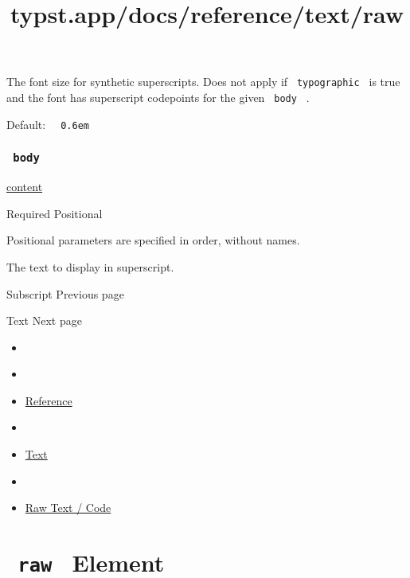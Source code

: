 The font size for synthetic superscripts. Does not apply if
\texttt{\ typographic\ } is true and the font has superscript codepoints
for the given \texttt{\ body\ } .

Default: \texttt{\ }{\texttt{\ 0.6em\ }}\texttt{\ }

\subsubsection{\texorpdfstring{\texttt{\ body\ }}{ body }}\label{parameters-body}

\href{/docs/reference/foundations/content/}{content}

{Required} {{ Positional }}

\label{parameters-body-positional-tooltip}
Positional parameters are specified in order, without names.

The text to display in superscript.

\href{/docs/reference/text/sub/}{\pandocbounded{}}

{ Subscript } { Previous page }

\href{/docs/reference/text/text/}{\pandocbounded{}}

{ Text } { Next page }


\title{typst.app/docs/reference/text/raw}

\begin{itemize}
\tightlist
\item
  \href{/docs}{}
\item
  
\item
  \href{/docs/reference/}{Reference}
\item
  
\item
  \href{/docs/reference/text/}{Text}
\item
  
\item
  \href{/docs/reference/text/raw/}{Raw Text / Code}
\end{itemize}

\section{\texorpdfstring{\texttt{\ raw\ } {{ Element
}}}{ raw   Element }}\label{summary}


